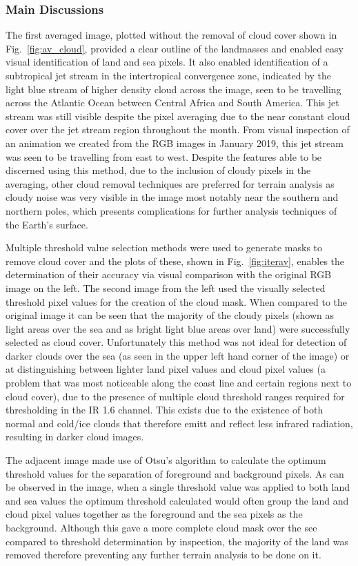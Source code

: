 \subsubsection{Main Discussions}
The first averaged image, plotted without the removal of cloud cover shown in Fig.~\ref{fig:av_cloud}, provided a clear outline of the landmasses and enabled easy visual identification of land and sea pixels. It also enabled identification of a subtropical jet stream in the intertropical convergence zone, indicated by the light blue stream of higher density cloud across the image, seen to be travelling across the Atlantic Ocean between Central Africa and South America. This jet stream was still visible despite the pixel averaging due to the near constant cloud cover over the jet stream region throughout the month. From visual inspection of an animation we created from the RGB images in January 2019, this jet stream was seen to be travelling from east to west. Despite the features able to be discerned using this method, due to the inclusion of cloudy pixels in the averaging, other cloud removal techniques are preferred for terrain analysis as cloudy noise was very visible in the image most notably near the southern and northern poles, which presents complications for further analysis techniques of the Earth's surface.
\par
Multiple threshold value selection methods were used to generate masks to remove cloud cover and the plots of these, shown in Fig.~\ref{fig:iterav}, enables the determination of their accuracy via visual comparison with the original RGB image on the left. The second image from the left used the visually selected threshold pixel values for the creation of the cloud mask. When compared to the original image it can be seen that the majority of the cloudy pixels (shown as light areas over the sea and as bright light blue areas over land) were successfully selected as cloud cover. Unfortunately this method was not ideal for detection of darker clouds over the sea (as seen in the upper left hand corner of the image) or at distinguishing between lighter land pixel values and cloud pixel values (a problem that was most noticeable along the coast line and certain regions next to cloud cover), due to the presence of multiple cloud threshold ranges required for thresholding in the IR 1.6 channel. This exists due to the existence of both normal and cold/ice clouds that therefore emitt and reflect less infrared radiation, resulting in darker cloud images.
\par
The adjacent image made use of Otsu's algorithm to calculate the optimum threshold values for the separation of foreground and background pixels. As can be observed in the image, when a single threshold value was applied to both land and sea values the optimum threshold calculated would often group the land and cloud pixel values together as the foreground and the sea pixels as the background. Although this gave a more complete cloud mask over the see compared to threshold determination by inspection, the majority of the land was removed therefore preventing any further terrain analysis to be done on it. 
